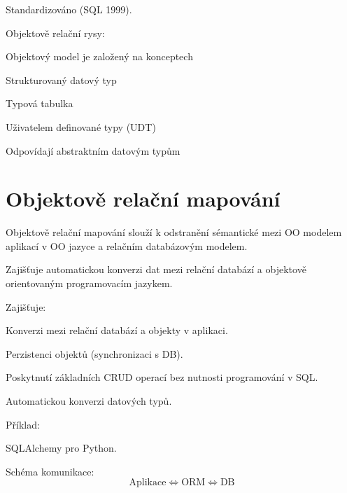 \begin{compactitem}
    \item Standardizováno (SQL 1999).

    \item Objektově relační rysy: \begin{compactitem}
        \item Objektový model je založený na konceptech \begin{compactitem}
            \item Strukturovaný datový typ
            \item Typová tabulka
        \end{compactitem}
        \item Uživatelem definované typy (UDT) \begin{compactitem}
            \item Odpovídají abstraktním datovým typům
        \end{compactitem}
    \end{compactitem}
\end{compactitem}


\section{Objektově relační mapování}

\begin{compactitem}
    \item Objektově relační mapování slouží k odstranění sémantické  mezi OO modelem aplikací v OO jazyce a relačním databázovým modelem.
    \begin{compactitem}
        \item Zajišťuje automatickou konverzi dat mezi relační databází a objektově orientovaným programovacím jazykem.
    \end{compactitem}

    \item Zajišťuje: \begin{compactitem}
        \item Konverzi mezi relační databází a objekty v aplikaci.
        \item Perzistenci objektů (synchronizaci s DB).
        \item Poskytnutí základních CRUD operací bez nutnosti programování v SQL.
        \item Automatickou konverzi datových typů.
    \end{compactitem}

    \item Příklad: \begin{compactitem}
        \item SQLAlchemy pro Python.
    \end{compactitem}

    \item Schéma komunikace:
    $$ \text{Aplikace} \Leftrightarrow \text{ORM} \Leftrightarrow \text{DB} $$
\end{compactitem}

